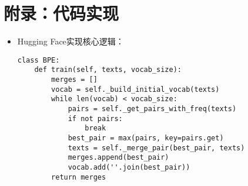 \documentclass{article}
\begin{document}
\section*{附录：代码实现}
\begin{itemize}
    \item Hugging Face实现核心逻辑：
    \begin{verbatim}
class BPE:
    def train(self, texts, vocab_size):
        merges = []
        vocab = self._build_initial_vocab(texts)
        while len(vocab) < vocab_size:
            pairs = self._get_pairs_with_freq(texts)
            if not pairs:
                break
            best_pair = max(pairs, key=pairs.get)
            texts = self._merge_pair(best_pair, texts)
            merges.append(best_pair)
            vocab.add(''.join(best_pair))
        return merges
    \end{verbatim}
\end{itemize}
\end{document}
